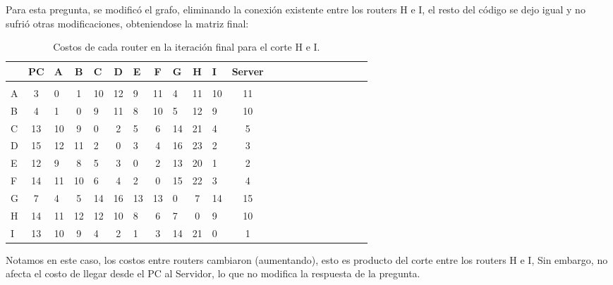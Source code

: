 \documentclass[a4papaer]{article}
\begin{document}
Para esta pregunta, se modificó el grafo, eliminando la conexión existente entre los routers H e I, el resto del código se dejo igual y no sufrió otras modificaciones, obteniendose la matriz final:
\pagebreak
\begin{table}[h]
\centering
\begin{tabular}{lclclclclclclclclclclc}

& PC & A & B & C & D & E & F & G & H & I & Server \\\hline\\
A&3&0&1&10&12&9&11&4&11&10&11 \\
B&4&1&0&9&11&8&10&5&12&9&10 \\
C&13&10&9&0&2&5&6&14&21&4&5 \\
D&15&12&11&2&0&3&4&16&23&2&3 \\
E&12&9&8&5&3&0&2&13&20&1&2 \\
F&14&11&10&6&4&2&0&15&22&3&4 \\
G&7&4&5&14&16&13&13&0&7&14&15 \\
H&14&11&12&12&10&8&6&7&0&9&10 \\
I&13&10&9&4&2&1&3&14&21&0&1 \\

\end{tabular}
\caption{\label{tab:widgets}Costos de cada router en la iteración final para el corte H e I.}
\end{table}


Notamos en este caso, los costos entre routers cambiaron (aumentando), esto es producto del corte entre los routers H e I, Sin embargo, no afecta el costo de llegar desde el PC al Servidor, lo que no modifica la respuesta de la pregunta.
\end{document}
